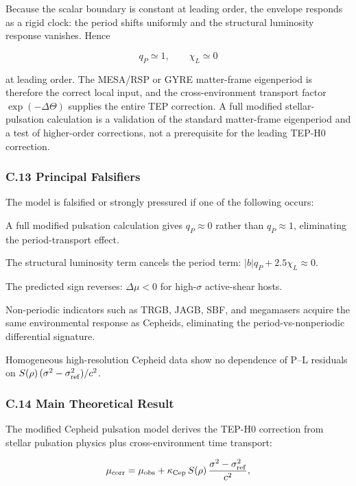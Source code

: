 \documentclass[
]{article}
\begin{document}
Because the scalar boundary is constant at leading order, the envelope
responds as a rigid clock: the period shifts uniformly and the
structural luminosity response vanishes. Hence

\begin{equation}
\boxed{q_{P} \simeq 1,\qquad \chi_{L} \simeq 0}
\end{equation}

at leading order. The MESA/RSP or GYRE matter-frame eigenperiod is
therefore the correct local input, and the cross-environment transport
factor \(\exp(-\Delta\Theta)\) supplies the entire TEP correction. A
full modified stellar-pulsation calculation is a validation of the
standard matter-frame eigenperiod and a test of higher-order
corrections, not a prerequisite for the leading TEP-H0 correction.

\subsubsection{C.13 Principal
Falsifiers}\label{c.13-principal-falsifiers}

The model is falsified or strongly pressured if one of the following
occurs:

A full modified pulsation calculation gives \(q_P \approx 0\) rather
than \(q_P \approx 1\), eliminating the period-transport effect.

The structural luminosity term cancels the period term:
\(|b|q_P + 2.5\chi_L \approx 0\).

The predicted sign reverses: \(\Delta\mu < 0\) for high-\(\sigma\)
active-shear hosts.

Non-periodic indicators such as TRGB, JAGB, SBF, and megamasers acquire
the same environmental response as Cepheids, eliminating the
period-vs-nonperiodic differential signature.

Homogeneous high-resolution Cepheid data show no dependence of P--L
residuals on \(S(\rho)\,(\sigma^2 - \sigma_{\rm ref}^2)/c^2\).

\subsubsection{C.14 Main Theoretical
Result}\label{c.14-main-theoretical-result}

The modified Cepheid pulsation model derives the TEP-H0 correction from
stellar pulsation physics plus cross-environment time transport:

\begin{equation}
\mu_{\rm corr} = \mu_{\rm obs} + \kappa_{\rm Cep}\,S(\rho)\,\frac{\sigma^2 - \sigma_{\rm ref}^2}{c^2} ,
\end{equation}
\end{document}
